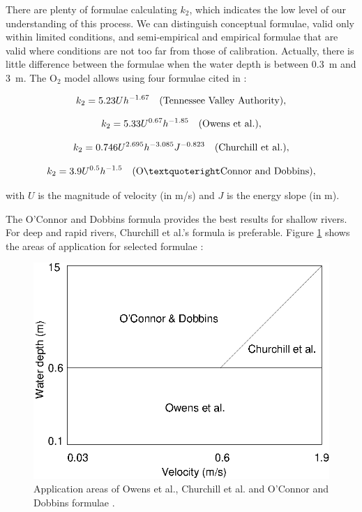 There are plenty of formulae calculating $k_2$,
which indicates the low level of our understanding of this process.
We can distinguish conceptual formulae,
valid only within limited conditions,
and semi-empirical and empirical formulae
that are valid where conditions are not too far from those of calibration.
Actually, there is little difference between the formulae when the water depth
is between 0.3~m and 3~m.
The O$_2$ model allows using four formulae cited in \cite{mccutcheon_wq_1989}:

\begin{equation}
  k_2 = 5.23 U h^{-1.67} \quad \rm{(Tennessee~Valley~Authority)},
\end{equation}

\begin{equation}
  k_2 = 5.33 U^{0.67} h^{-1.85} \quad \rm{(Owens~et~al.)},
\end{equation}

\begin{equation}
  k_2 = 0.746 U^{2.695} h^{-3.085} J^{-0.823} \quad \rm{(Churchill~et~al.)},
\end{equation}

\begin{equation}
  k_2 = 3.9 U^{0.5} h^{-1.5} \quad \rm{(O’Connor~and~Dobbins)},
\end{equation}

with $U$ is the magnitude of velocity (in m/s)
and $J$ is the energy slope (in m).

The O’Connor and Dobbins formula provides the best results for shallow rivers.
For deep and rapid rivers, Churchill et al.'s formula is preferable.
Figure \ref{validity_domain_reaeration} shows the areas of application for selected formulae
\cite{mccutcheon_wq_1989}:

\begin{figure}[H]
  \centering
  \includegraphics[scale=0.3]{graphics/validity_domain_reaeration_O2.png}
  \caption{Application areas of Owens et al., Churchill et al. and O'Connor
    and Dobbins formulae \cite{mccutcheon_wq_1989}.}
  \label{validity_domain_reaeration}
\end{figure}

